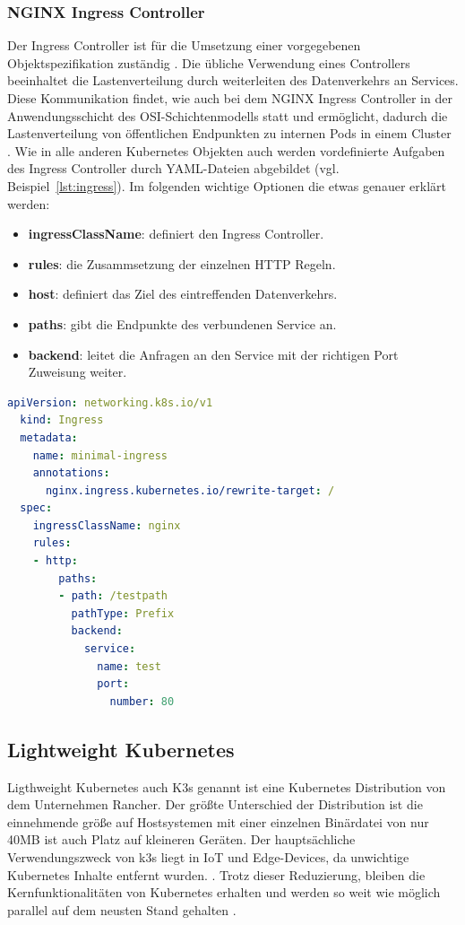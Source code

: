 \subsubsection{NGINX Ingress Controller}
Der Ingress Controller ist für die Umsetzung einer vorgegebenen Objektspezifikation zuständig \cite{kubernetesingress}.
Die übliche Verwendung eines Controllers beeinhaltet die Lastenverteilung durch weiterleiten des Datenverkehrs an Services. 
Diese Kommunikation findet, wie auch bei dem NGINX Ingress Controller \cite{kubernetesingresscontrollerlayer} in der Anwendungsschicht des OSI-Schichtenmodells statt und ermöglicht, dadurch die 
Lastenverteilung von öffentlichen Endpunkten zu internen Pods in einem Cluster \cite{kubernetesingressibm}.
Wie in alle anderen Kubernetes Objekten auch werden vordefinierte Aufgaben des Ingress Controller durch YAML-Dateien abgebildet (vgl. Beispiel~\ref{lst:ingress}).
Im folgenden wichtige Optionen die etwas genauer erklärt werden:

\begin{itemize}
  \item \textbf{ingressClassName}: definiert den Ingress Controller.
  \item \textbf{rules}: die Zusammsetzung der einzelnen HTTP Regeln.
  \item \textbf{host}: definiert das Ziel des eintreffenden Datenverkehrs.
  \item \textbf{paths}: gibt die Endpunkte des verbundenen Service an.
  \item \textbf{backend}: leitet die Anfragen an den Service mit der richtigen Port Zuweisung weiter.
\end{itemize}

\begin{lstlisting}[caption={ingress.yaml \cite{kubernetesingress} },captionpos=b,label={lst:ingress},language=yaml]
  apiVersion: networking.k8s.io/v1
  kind: Ingress
  metadata:
    name: minimal-ingress
    annotations:
      nginx.ingress.kubernetes.io/rewrite-target: /
  spec:
    ingressClassName: nginx
    rules:
    - http:
        paths:
        - path: /testpath
          pathType: Prefix
          backend:
            service:
              name: test
              port:
                number: 80
  \end{lstlisting}

\subsection{Lightweight Kubernetes}
Ligthweight Kubernetes auch K3s genannt ist eine Kubernetes Distribution von dem Unternehmen
Rancher. Der größte Unterschied der Distribution ist die einnehmende größe 
auf Hostsystemen mit einer einzelnen Binärdatei von nur 40MB ist auch Platz auf kleineren Geräten.
Der hauptsächliche Verwendungszweck von k3s liegt in IoT und Edge-Devices, da unwichtige Kubernetes Inhalte entfernt wurden. \cite{k3s}.
Trotz dieser Reduzierung, bleiben die Kernfunktionalitäten von Kubernetes erhalten und werden 
so weit wie möglich parallel auf dem neusten Stand gehalten \cite{k3sgit}.

